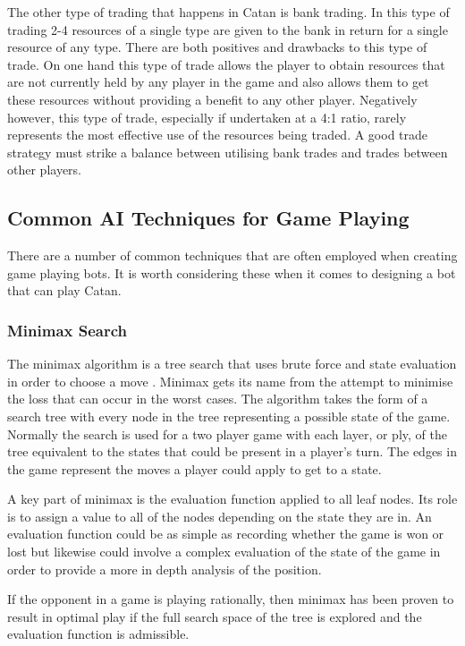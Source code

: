 \documentclass[]{article}
\begin{document}
\par The other type of trading that happens in Catan is bank trading. In this type of trading 2-4 resources of a single type are given to the bank in return for a single resource of any type. There are both positives and drawbacks to this type of trade. On one hand this type of trade allows the player to obtain resources that are not currently held by any player in the game and also allows them to get these resources without providing a benefit to any other player. Negatively however, this type of trade, especially if undertaken at a 4:1 ratio, rarely represents the most effective use of the resources being traded. A good trade strategy must strike a balance between utilising bank trades and trades between other players.

\subsection{Common AI Techniques for Game Playing}
There are a number of common techniques that are often employed when creating game playing bots. It is worth considering these when it comes to designing a bot that can play Catan.
\subsubsection{Minimax Search}
The minimax algorithm is a tree search that uses brute force and state evaluation in order to choose a move \autocite[122]{russell1995modern}. Minimax gets its name from the attempt to minimise the loss that can occur in the worst cases. The algorithm takes the form of a search tree with every node in the tree representing a possible state of the game. Normally the search is used for a two player game with each layer, or ply, of the tree equivalent to the states that could be present in a player's turn. The edges in the game represent the moves a player could apply to get to a state.

\par A key part of minimax is the evaluation function applied to all leaf nodes. Its role is to assign a value to all of the nodes depending on the state they are in. An evaluation function could be as simple as recording whether the game is won or lost but likewise could involve a complex evaluation of the state of the game in order to provide a more in depth analysis of the position.

\par If the opponent in a game is playing rationally, then minimax has been proven to result in optimal play if the full search space of the tree is explored and the evaluation function is admissible.
\end{document}
